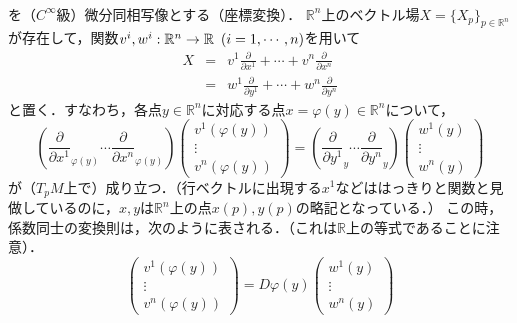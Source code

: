 \documentclass[uplatex, dvipdfmx]{jsreport}
\begin{document}
\begin{shadebox}\begin{theorem}　
    \begin{center}
    \end{center}
    を（$C^\infty$級）微分同相写像とする（座標変換）．
    $\mathbb{R}^n$上のベクトル場$X=\{X_p\}_{p\in\mathbb{R}^n}$が存在して，関数$v^i,w^i:\mathbb{R}^n\to\mathbb{R}\hspace{0.5em}(i=1,\cdots,n)$を用いて
    \begin{eqnarray*}
        X &=& v^1\frac{\partial}{\partial x^1}+\cdots +v^n\frac{\partial}{\partial x^n} \\
        &=& w^1\frac{\partial}{\partial y^1}+\cdots +w^n\frac{\partial}{\partial y^n}
    \end{eqnarray*}
    と置く．すなわち，各点$y\in\mathbb{R}^n$に対応する点$x=\varphi(y)\in\mathbb{R}^n$について，
    \begin{equation}
        \left( \frac{\partial}{\partial x^1}_{\varphi(y)}\cdots \frac{\partial}{\partial x^n}_{\varphi(y)} \right) \left( \begin{array}{c}
            v^1(\varphi(y)) \\ \vdots \\ v^n(\varphi(y))
        \end{array} \right) = \left( \frac{\partial}{\partial y^1}_y\cdots \frac{\partial}{\partial y^n}_y \right) \left( \begin{array}{c}
            w^1(y) \\ \vdots \\ w^n(y)
        \end{array} \right)
    \label{equation-change-of-basis}
    \end{equation}
    が（$T_pM$上で）成り立つ．（行ベクトルに出現する$x^1$などははっきりと関数と見做しているのに，$x,y$は$\mathbb{R}^n$上の点$x(p),y(p)$の略記となっている．）
    この時，係数同士の変換則は，次のように表される．（これは$\mathbb{R}$上の等式であることに注意）．
    \[ \left( \begin{array}{c} v^1(\varphi(y)) \\ \vdots \\ v^n(\varphi(y)) \end{array} \right) = D\varphi(y) \left( \begin{array}{c} w^1(y) \\ \vdots \\ w^n(y) \end{array} \right) \]
\end{theorem}\end{shadebox}
\end{document}
